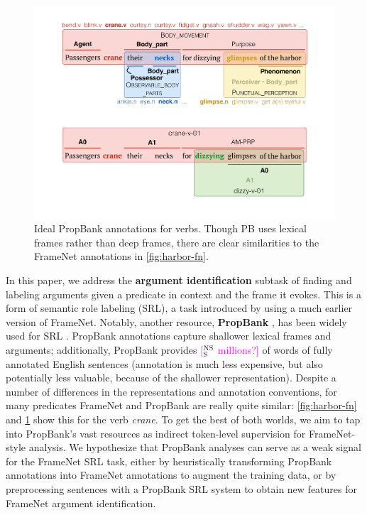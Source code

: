 \documentclass[11pt,a4paper]{article}
\newcommand{\ensuretext}[1]{#1}
\newcommand{\nssmarker}{\ensuretext{\textcolor{magenta}{\ensuremath{^{\textsc{NS}}_{\textsc{S}}}}}}
\newcommand{\arkcomment}[3]{\ensuretext{\textcolor{#3}{[#1 #2]}}}
\newcommand{\nss}[1]{\arkcomment{\nssmarker}{#1}{magenta}}
\begin{document}
\begin{figure}
\includegraphics[width=\columnwidth]{fig/harbor-pb.pdf}
\caption{Ideal PropBank annotations for verbs. Though PB uses lexical frames rather than deep frames,
there are clear similarities to the FrameNet annotations in \cref{fig:harbor-fn}.}
\label{fig:harbor-pb}
\end{figure}

In this paper, we address the \textbf{argument identification} 
subtask of finding and labeling arguments 
given a predicate in context and the frame it evokes.
This is a form of semantic role labeling (SRL), 
a task introduced by \citet{gildea-02} using a much earlier version of FrameNet.
Notably, another resource, \textbf{PropBank} \citep{propbank}, has been widely used for SRL \citep{palmer-10}. 
PropBank annotations capture shallower lexical frames and arguments; 
additionally, PropBank provides \nss{millions?} of words of fully annotated English sentences
(annotation is much less expensive, but also potentially less valuable, because of the shallower representation).
Despite a number of differences in the representations and annotation conventions, 
for many predicates FrameNet and PropBank are really quite similar: 
\cref{fig:harbor-fn} and \cref{fig:harbor-pb} show this for the verb \textit{crane}.
To get the best of both worlds, we aim to tap into PropBank's vast resources 
as indirect token-level supervision for FrameNet-style analysis. 
We hypothesize that PropBank analyses can serve as a weak signal for the FrameNet SRL task, 
either by heuristically transforming PropBank annotations into FrameNet annotations 
to augment the training data, or by preprocessing sentences with a PropBank SRL system to obtain new features 
for FrameNet argument identification.
\end{document}
